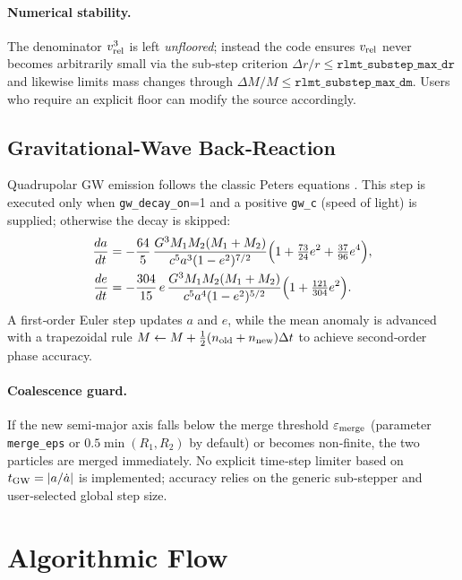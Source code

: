\documentclass[11pt]{article}
\begin{document}
\paragraph{Numerical stability.}
The denominator $v_{\rm rel}^3$ is left \emph{unfloored}; instead the code
ensures $v_{\rm rel}$ never becomes arbitrarily small via the
sub‑step criterion $\Delta r/r\le\texttt{rlmt\_substep\_max\_dr}$ and likewise
limits mass changes through $\Delta M/M\le\texttt{rlmt\_substep\_max\_dm}$.
Users who require an explicit floor can modify the source accordingly.

\subsection{Gravitational‑Wave Back‑Reaction}
\label{sec:gw}

Quadrupolar GW emission follows the classic Peters equations
\citep{Peters1964}. This step is executed only when
\texttt{gw\_decay\_on}=1 and a positive \texttt{gw\_c} (speed of light) is
supplied; otherwise the decay is skipped:
\begin{align}
\frac{da}{dt} &=
-\frac{64}{5}\,\frac{G^3M_1M_2(M_1+M_2)}{c^5a^3(1-e^2)^{7/2}}
\Bigl(1+\tfrac{73}{24}e^2+\tfrac{37}{96}e^4\Bigr),
\label{eq:da_dt}\\
\frac{de}{dt} &=
-\frac{304}{15}\,e\,\frac{G^3M_1M_2(M_1+M_2)}{c^5a^4(1-e^2)^{5/2}}
\Bigl(1+\tfrac{121}{304}e^2\Bigr).
\label{eq:de_dt}
\end{align}
A first‑order Euler step updates $a$ and $e$, while the mean anomaly is
advanced with a trapezoidal rule
\(
M\gets M+\tfrac12(n_{\rm old}+n_{\rm new})\Delta t
\)
to achieve second‑order phase accuracy.

\paragraph{Coalescence guard.}
If the new semi‑major axis falls below the merge threshold
$\varepsilon_{\rm merge}$ (parameter \texttt{merge\_eps} or
$0.5\min(R_1,R_2)$ by default) or becomes non‑finite, the two particles are
merged immediately. No explicit time‑step limiter based on
$t_{\rm GW}=|a/\dot a|$ is implemented; accuracy relies on the generic
sub‑stepper and user‑selected global step size.

\section{Algorithmic Flow}
\end{document}
